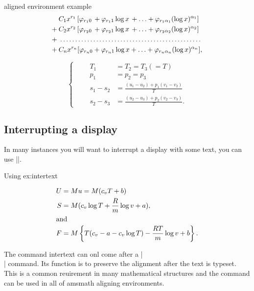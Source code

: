 \begin{texexample}{aligned environment example}{}
\begin{equation}
\begin{aligned}
  &\:C_1x^{r_1}\,[\varphi_{r_1 0} \,+ \varphi_{r_1 1}\log x \,+ \dotsb + \varphi_{r_1 \alpha_1}(\log x)^{\alpha_1}]\\
+ &\:C_2x^{r_2}\,[\varphi_{r_2 0} \,+ \varphi_{r_2 1}\log x \,+ \dotsb + \varphi_{r_2 \alpha_2}(\log x)^{\alpha_2}]\\
+ &\multispan{1}{\:\dotfill}\\
+ &\:C_nx^{r_n}[\varphi_{r_n 0} + \varphi_{r_n 1}\log x + \dotsb + \varphi_{r_n \alpha_n}(\log x)^{\alpha_n}],
\end{aligned}
\end{equation}

\[
\tag{98}
\left\{\qquad
\begin{aligned}
T_1 &= T_2 = T_3 (=T)\\
p_1 &= p_2 = p_3\\
s_1-s_2 &= \frac{(u_1-u_2)+p_1(v_1-v_2)}{T}\\
s_2-s_3 &= \frac{(u_2-u_3)+p_2(v_2-v_3)}{T}.
\end{aligned}
\right.
\]
\end{texexample}




\subsection{Interrupting a display}

In many instances you will want to interrupt a display with some text, you can use |\intertext|.

\begin{texexample}{Using }{ex:intertext}

\begin{align}
U &= M u = M(c_v T + b)\\
S &= M(c_v  \log T + \frac{R}{m}  \log v + a),\\
\intertext{and}
F &= M \left\{T(c_v - a - c_v \log T) - \frac{RT}{m} \log v + b \right\}.
\end{align}
\end{texexample}

The command intertext can onl come after a |\\|  command. Its function is to preserve the alignment after the text is typeset. This is a common reuirement in many mathematical structures and the command can be used in all of amsmath aligning environments.






